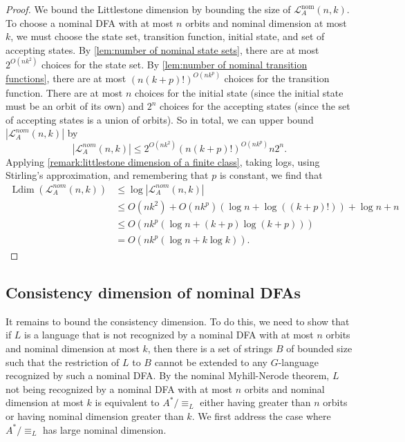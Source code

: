 \documentclass[runningheads]{llncs}
\newcommand{\mc}{\mathcal}
\DeclareMathOperator{\Ldim}{Ldim}
\begin{document}
\begin{proof}
    We bound the Littlestone dimension by bounding the size of $\mc L^{\text{nom}}_A(n,k)$. 
    To choose a nominal DFA with at most $n$ orbits and nominal dimension at most $k$, we must choose the state set, transition function, initial state, and set of accepting states. 
    By \autoref{lem:number of nominal state sets}, there are at most $2^{O(nk^2)}$ choices for the state set. 
    By \autoref{lem:number of nominal transition functions}, there are at most $\left(n (k+p)!\right)^{O(nk^{p})}$ choices for the transition function.
    There are at most $n$ choices for the initial state (since the initial state must be an orbit of its own) and $2^n$ choices for the accepting states (since the set of accepting states is a union of orbits).
    So in total, we can upper bound $|\mc L^{nom}_A(n,k)|$ by 
    \[
        |\mc L^{nom}_A(n,k)| \leq 2^{O\left(nk^2\right)} \left(n (k+p)!\right)^{O\left(nk^{p}\right)} n 2^n.
    \]
    Applying \autoref{remark:littlestone dimension of a finite class}, taking logs, using Stirling's approximation, and remembering that $p$ is constant, we find that 
    \begin{align*}
        \Ldim(\mc L^{nom}_A(n,k)) &\leq \log |\mc L^{nom}_A(n,k)| \\
        &\leq O\left(nk^2\right) + O\left(nk^{p}\right)(\log n + \log((k+p)!)) + \log n + n \\
        &\leq O\left(nk^{p} \left(\log n + (k+p)\log(k+p) \right)\right) \\
        &= O\left(nk^{p} \left(\log n + k \log k \right)\right).
    \end{align*}
\end{proof}


\subsection{Consistency dimension of nominal DFAs}

It remains to bound the consistency dimension.
To do this, we need to show that if $L$ is a language that is not recognized by a nominal DFA with at most $n$ orbits and nominal dimension at most $k$, then there is a set of strings $B$ of bounded size such that the restriction of $L$ to $B$ cannot be extended to any $G$-language recognized by such a nominal DFA. 
By the nominal Myhill-Nerode theorem, $L$ not being recognized by a nominal DFA with at most $n$ orbits and nominal dimension at most $k$ is equivalent to $A^* / \equiv_L$ either having greater than $n$ orbits or having nominal dimension greater than $k$.
We first address the case where $A^* / \equiv_L$ has large nominal dimension.
\end{document}
